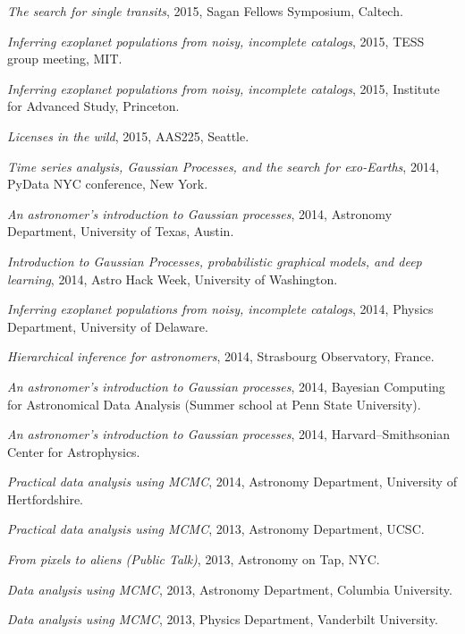 \documentclass[12pt,letterpaper]{article}
\begin{document}
\begin{list}{}{\cvlist}
\item \emph{The search for single transits},
    2015, Sagan Fellows Symposium, Caltech.

\item \emph{Inferring exoplanet populations from noisy, incomplete catalogs},
    2015, TESS group meeting, MIT.

\item \emph{Inferring exoplanet populations from noisy, incomplete catalogs},
    2015, Institute for Advanced Study, Princeton.

\item \emph{Licenses in the wild},
    2015, AAS225, Seattle.

\item \emph{Time series analysis, Gaussian Processes, and the search for
            exo-Earths},
    2014, PyData NYC conference, New York.

\item \emph{An astronomer's introduction to Gaussian processes},
    2014, Astronomy Department, University of Texas, Austin.

\item \emph{Introduction to Gaussian Processes, probabilistic graphical
            models, and deep learning},
    2014, Astro Hack Week, University of Washington.

\item \emph{Inferring exoplanet populations from noisy, incomplete catalogs},
    2014, Physics Department, University of Delaware.

\item \emph{Hierarchical inference for astronomers},
    2014, Strasbourg Observatory, France.

\item \emph{An astronomer's introduction to Gaussian processes},
    2014, Bayesian Computing for Astronomical Data Analysis (Summer school at
    Penn State University).

\item \emph{An astronomer's introduction to Gaussian processes},
    2014, Harvard--Smithsonian Center for Astrophysics.

\item \emph{Practical data analysis using MCMC},
    2014, Astronomy Department, University of Hertfordshire.

\item \emph{Practical data analysis using MCMC},
    2013, Astronomy Department, UCSC.

\item \emph{From pixels to aliens (Public Talk)},
    2013, Astronomy on Tap, NYC.

\item \emph{Data analysis using MCMC},
    2013, Astronomy Department, Columbia University.

\item \emph{Data analysis using MCMC},
    2013, Physics Department, Vanderbilt University.
\end{list}
\end{document}
